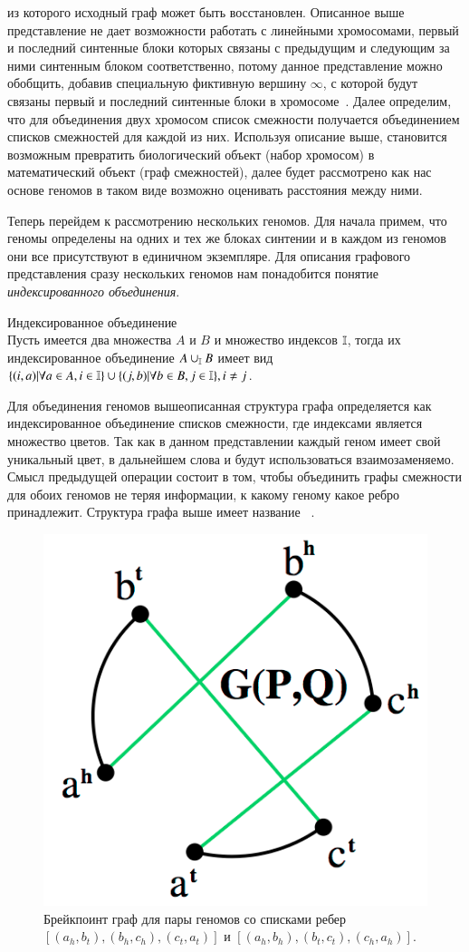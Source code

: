 из которого исходный граф может быть восстановлен.
Описанное выше представление не дает возможности работать с линейными хромосомами,
первый и последний синтенные блоки которых связаны с предыдущим и следующим за ними синтенным блоком соответственно, потому
данное представление можно обобщить, добавив специальную фиктивную вершину $\infty$,
с которой будут связаны первый и последний синтенные блоки в хромосоме~\cite{Alekseyev2009}.
Далее определим, что для объединения двух хромосом список смежности получается объединением списков смежностей для каждой из них.
Используя описание выше, становится возможным превратить биологический объект (набор хромосом) в математический объект (граф смежностей),
далее будет рассмотрено как нас основе геномов в таком виде возможно оценивать расстояния между ними.

Теперь перейдем к рассмотрению нескольких геномов.
Для начала примем, что геномы определены на одних и тех же блоках синтении и в каждом из геномов они все присутствуют в единичном экземпляре.
Для описания графового представления сразу нескольких геномов нам понадобится понятие \textit{индексированного объединения}.
\begin{define}{Индексированное объединение} \\
  Пусть имеется два множества $A$ и $B$ и множество индексов $\mathbb{I}$, тогда их индексированное объединение
  $A \cup_{\mathbb{I}} B$ имеет вид $\{ (i, a) | \forall a \in A, i \in \mathbb{I}\} \cup \{ (j, b) | \forall b \in B, j \in \mathbb{I}\}, i \neq j$.
\end{define}
Для объединения геномов вышеописанная структура графа определяется как индексированное объединение списков смежности, где индексами является множество цветов.
Так как в данном представлении каждый геном имеет свой уникальный цвет, в дальнейшем слова  и  будут использоваться взаимозаменяемо.
Смысл предыдущей операции состоит в том, чтобы объединить графы смежности для обоих геномов не теряя информации, к какому геному какое ребро принадлежит.
Структура графа выше имеет название ~\cite{bafna1996genome}.
\begin{figure}[H]
  \centering
  \includegraphics[max width=0.4\linewidth]{fig/1/two_genomes_bp_graph.png}
  \caption{Брейкпоинт граф для пары геномов со списками ребер $[(a_h, b_t), (b_h, c_h), (c_t, a_t)]$ и $[(a_h, b_h), (b_t, c_t), (c_h, a_h)]$.}
  \label{fig:two_genomes_bp_graph}
\end{figure}
